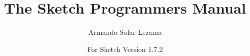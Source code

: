 \documentclass{article}
\newcommand{\version}{1.7.2}
\begin{document}

\title{The Sketch Programmers Manual}
\author{Armando Solar-Lezama}
\date{For Sketch Version \version{}}
\maketitle

\tableofcontents

\newpage







\let\glossarysection=\section
\renewcommand{\glossarypreamble}{\label{glossary}This is a glossary of flags}
\printglossary[title=Glossary of Flags]
\end{document}
